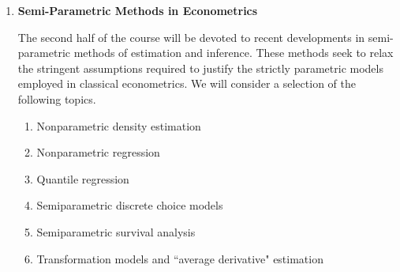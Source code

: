 \documentclass[12pt]{article}
\begin{document}
\begin{enumerate}
\item {\bf Semi-Parametric Methods in Econometrics}

The second half of the course will be devoted to recent developments in 
semi-parametric methods of estimation and inference.  These methods seek to 
relax the stringent assumptions required to justify the strictly parametric 
models employed in classical econometrics.  We will consider a selection of
the following topics.

\begin{enumerate}
\item Nonparametric density estimation
\item Nonparametric regression
\item Quantile regression
\item Semiparametric discrete choice models
\item Semiparametric survival analysis
\item Transformation models and ``average derivative" estimation
\end{enumerate}


\end{enumerate}
\end{document}
